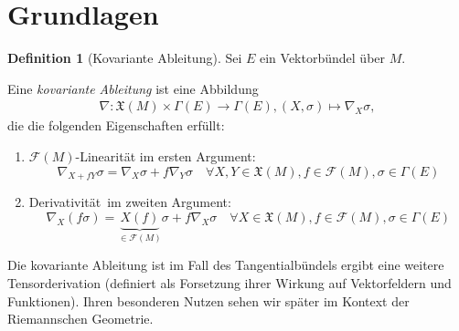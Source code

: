 \documentclass[a4paper]{scrreprt}
\numberwithin{equation}{chapter}
\newcommand{\sm}{\mathcal{F}}
\newcommand{\vf}{\mathfrak{X}}
\theoremstyle{definition}
\newtheorem{defn}{Definition}[section]
\begin{document}
	\section{Grundlagen}
		\begin{defn}[Kovariante Ableitung]Sei $E$ ein Vektorbündel über $M$.
		
			Eine \emph{kovariante Ableitung} ist eine Abbildung
			\begin{align*}
				\nabla\colon \vf(M)\times\Gamma(E)\rightarrow\Gamma(E), (X,\sigma)\mapsto \nabla_X \sigma,
			\end{align*}
			die die folgenden Eigenschaften erfüllt:
			\begin{enumerate}[label=\arabic*]
				\item $\sm(M)$-Linearität im ersten Argument: 
				\begin{equation*}
					\nabla_{X+fY}\sigma=\nabla_X\sigma+f\nabla_Y \sigma\quad\forall X,Y\in\vf(M), f\in\sm(M),\sigma\in\Gamma(E)
				\end{equation*}
				\item \glqq Derivativität\grqq\ im zweiten Argument: 
				\begin{equation*}
					\nabla_X(f\sigma)=\underbrace{X(f)}_{\in\sm(M)} \sigma+f\nabla_X \sigma\quad\forall X\in\vf(M), f\in\sm(M),\sigma\in\Gamma(E)
				\end{equation*}
			\end{enumerate}
		\end{defn}
		Die kovariante Ableitung ist im Fall des Tangentialbündels ergibt eine weitere Tensorderivation (definiert als Forsetzung ihrer Wirkung auf Vektorfeldern und Funktionen). Ihren besonderen Nutzen sehen wir später im Kontext der Riemannschen Geometrie.
		
\end{document}
